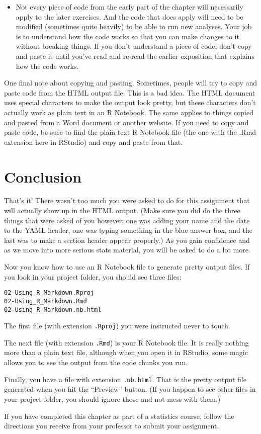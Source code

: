 \documentclass[
]{book}
\providecommand{\tightlist}{%
  \setlength{\itemsep}{0pt}\setlength{\parskip}{0pt}}
\begin{document}
\begin{itemize}
\tightlist
\item
  Not every piece of code from the early part of the chapter will necessarily apply to the later exercises. And the code that does apply will need to be modified (sometimes quite heavily) to be able to run new analyses. Your job is to understand how the code works so that you can make changes to it without breaking things. If you don't understand a piece of code, don't copy and paste it until you've read and re-read the earlier exposition that explains how the code works.
\end{itemize}

One final note about copying and pasting. Sometimes, people will try to copy and paste code from the HTML output file. This is a bad idea. The HTML document uses special characters to make the output look pretty, but these characters don't actually work as plain text in an R Notebook. The same applies to things copied and pasted from a Word document or another website. If you need to copy and paste code, be sure to find the plain text R Notebook file (the one with the .Rmd extension here in RStudio) and copy and paste from that.

\hypertarget{rmark-conclusion}{%
\section{Conclusion}\label{rmark-conclusion}}

That's it! There wasn't too much you were asked to do for this assignment that will actually show up in the HTML output. (Make sure you did do the three things that were asked of you however: one was adding your name and the date to the YAML header, one was typing something in the blue answer box, and the last was to make a section header appear properly.) As you gain confidence and as we move into more serious stats material, you will be asked to do a lot more.

Now you know how to use an R Notebook file to generate pretty output files. If you look in your project folder, you should see three files:

\begin{verbatim}
02-Using_R_Markdown.Rproj
02-Using_R_Markdown.Rmd
02-Using_R_Markdown.nb.html
\end{verbatim}

The first file (with extension \texttt{.Rproj}) you were instructed never to touch.

The next file (with extension \texttt{.Rmd}) is your R Notebook file. It is really nothing more than a plain text file, although when you open it in RStudio, some magic allows you to see the output from the code chunks you run.

Finally, you have a file with extension \texttt{.nb.html}. That is the pretty output file generated when you hit the ``Preview'' button. (If you happen to see other files in your project folder, you should ignore those and not mess with them.)

If you have completed this chapter as part of a statistics course, follow the directions you receive from your professor to submit your assignment.

  
\end{document}
